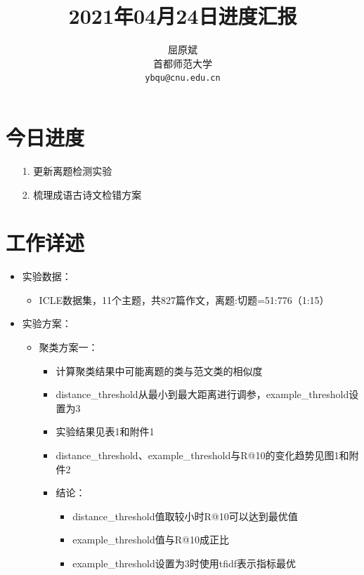 \documentclass[11pt]{article}
\title{2021年04月24日进度汇报}
\author{屈原斌 \\
  首都师范大学 \\
    {\tt ybqu@cnu.edu.cn}}
\date{}
\begin{document}
\begin{CJK}{UTF8}{gkai}

\maketitle
\CJKindent


\section{今日进度}


\begin{itemize}
  \item [1.] 更新离题检测实验
  \item [2.] 梳理成语古诗文检错方案
\end{itemize}

\section{工作详述}
\begin{itemize}
  \item 实验数据：
  \begin{itemize}
    \item ICLE数据集，11个主题，共827篇作文，离题:切题=51:776（1:15）
  \end{itemize}
  \item 实验方案：
  \begin{itemize}
    \item 聚类方案一：
    \begin{itemize}
      \item 计算聚类结果中可能离题的类与范文类的相似度
      \item distance\_threshold从最小到最大距离进行调参，example\_threshold设置为3
      \item 实验结果见表1和附件1
      \item distance\_threshold、example\_threshold与R@10的变化趋势见图1和附件2
      \item 结论：
      \begin{itemize}
        \item distance\_threshold值取较小时R@10可以达到最优值
        \item example\_threshold值与R@10成正比
        \item example\_threshold设置为3时使用tfidf表示指标最优
      \end{itemize}
    \end{itemize}
    

\end{itemize}
\end{itemize}
\end{CJK}
\end{document}
